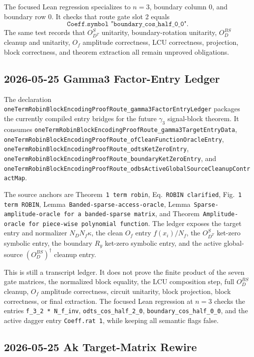 The focused Lean regression specializes to \(n=3\), boundary column \(0\), and
boundary row \(0\).  It checks that route gate slot 2 equals
\[
  \texttt{Coeff.symbol "boundary\_cos\_half\_0\_0"}.
\]
The same test records that \(O_{D^T}^{S}\) unitarity, boundary-rotation
unitarity, \(O_D^{BS}\) cleanup and unitarity, \(O_f\) amplitude correctness,
LCU correctness, projection, block correctness, and theorem extraction all
remain unproved obligations.

\subsection{2026-05-25 Gamma3 Factor-Entry Ledger}

The declaration
\texttt{oneTermRobinBlockEncodingProofRoute\_gamma3FactorEntryLedger}
packages the currently compiled entry bridges for the future
\(\gamma_3\) signal-block theorem.  It consumes
\texttt{oneTermRobinBlockEncodingProofRoute\_gamma3TargetEntryData},
\texttt{oneTermRobinBlockEncodingProofRoute\_ofCleanFunctionOracleEntry},
\texttt{oneTermRobinBlockEncodingProofRoute\_odtsKetZeroEntry},
\texttt{oneTermRobinBlockEncodingProofRoute\_boundaryKetZeroEntry}, and
\texttt{oneTermRobinBlockEncodingProofRoute\_odbsActiveGlobalSourceCleanupContractMap}.

The source anchors are Theorem~\texttt{1 term robin},
Eq.~\texttt{ROBIN clarified}, Fig.~\texttt{1 term ROBIN},
Lemma~\texttt{Banded-sparse-access-oracle},
Lemma~\texttt{Sparse-amplitude-oracle for a banded-sparse matrix}, and
Theorem~\texttt{Amplitude-oracle for piece-wise polynomial function}.  The
ledger exposes the target entry and normalizer \(N_DN_f\kappa\), the clean
\(O_f\) entry \(f(x_i)/N_f\), the \(O_{D^T}^{S}\) ket-zero symbolic entry,
the boundary \(R_y\) ket-zero symbolic entry, and the active global-source
\((O_D^{BS})^\dagger\) cleanup entry.

This is still a transcript ledger.  It does not prove the finite product of
the seven gate matrices, the normalized block equality, the LCU composition
step, full \(O_D^{BS}\) cleanup, \(O_f\) amplitude correctness, circuit
unitarity, block projection, block correctness, or final extraction.  The
focused Lean regression at \(n=3\) checks the entries
\texttt{f\_3\_2 * N\_f\_inv},
\texttt{odts\_cos\_half\_2\_0},
\texttt{boundary\_cos\_half\_0\_0}, and the active dagger entry
\texttt{Coeff.rat 1}, while keeping all semantic flags false.

\subsection{2026-05-25 Ak Target-Matrix Rewire}

